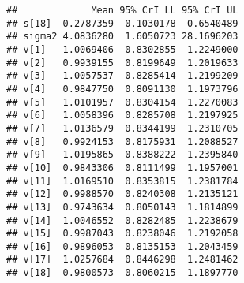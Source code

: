 \documentclass[]{article}
\newenvironment{Shaded}{\begin{snugshade}}{\end{snugshade}}
\newcommand{\CommentTok}[1]{\textcolor[rgb]{0.56,0.35,0.01}{\textit{#1}}}
\newcommand{\ControlFlowTok}[1]{\textcolor[rgb]{0.13,0.29,0.53}{\textbf{#1}}}
\newcommand{\DataTypeTok}[1]{\textcolor[rgb]{0.13,0.29,0.53}{#1}}
\newcommand{\DecValTok}[1]{\textcolor[rgb]{0.00,0.00,0.81}{#1}}
\newcommand{\FloatTok}[1]{\textcolor[rgb]{0.00,0.00,0.81}{#1}}
\newcommand{\KeywordTok}[1]{\textcolor[rgb]{0.13,0.29,0.53}{\textbf{#1}}}
\newcommand{\NormalTok}[1]{#1}
\newcommand{\OperatorTok}[1]{\textcolor[rgb]{0.81,0.36,0.00}{\textbf{#1}}}
\newcommand{\StringTok}[1]{\textcolor[rgb]{0.31,0.60,0.02}{#1}}
\begin{document}
\begin{Shaded}
\end{Shaded}

\begin{verbatim}
##             Mean 95% CrI LL 95% CrI UL
## s[18]  0.2787359  0.1030178  0.6540489
## sigma2 4.0836280  1.6050723 28.1696203
## v[1]   1.0069406  0.8302855  1.2249000
## v[2]   0.9939155  0.8199649  1.2019633
## v[3]   1.0057537  0.8285414  1.2199209
## v[4]   0.9847750  0.8091130  1.1973796
## v[5]   1.0101957  0.8304154  1.2270083
## v[6]   1.0058396  0.8285708  1.2197925
## v[7]   1.0136579  0.8344199  1.2310705
## v[8]   0.9924153  0.8175931  1.2088527
## v[9]   1.0195865  0.8388222  1.2395840
## v[10]  0.9843306  0.8111499  1.1957001
## v[11]  1.0169510  0.8353815  1.2381784
## v[12]  0.9988570  0.8240308  1.2135121
## v[13]  0.9743634  0.8050143  1.1814899
## v[14]  1.0046552  0.8282485  1.2238679
## v[15]  0.9987043  0.8238046  1.2192058
## v[16]  0.9896053  0.8135153  1.2043459
## v[17]  1.0257684  0.8446298  1.2481462
## v[18]  0.9800573  0.8060215  1.1897770
\end{verbatim}
\end{document}
